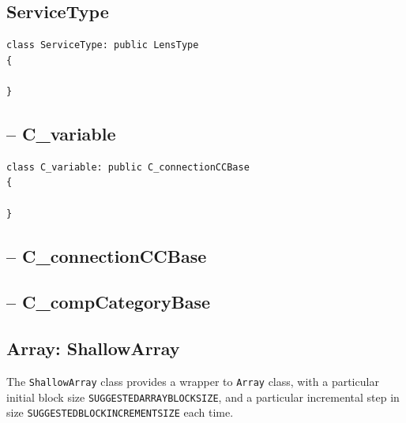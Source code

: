 \subsection{ServiceType}
\label{sec:ServiceType}

\begin{verbatim}
class ServiceType: public LensType
{

}
\end{verbatim}

\subsection{-- C\_variable}
\label{sec:C_variable}

\begin{lstlisting}
class C_variable: public C_connectionCCBase
{

}
\end{lstlisting}

\subsection{-- C\_connectionCCBase}
\label{sec:C_connectionCCBase}


\subsection{-- C\_compCategoryBase}
\label{sec:C_compCategoryBase}



\subsection{Array: ShallowArray}
\label{sec:Array}

The \verb!ShallowArray! class provides a wrapper to \verb!Array! class, with a
particular initial block size \verb!SUGGESTEDARRAYBLOCKSIZE!, and a particular
incremental step in size \verb!SUGGESTEDBLOCKINCREMENTSIZE! each time.

